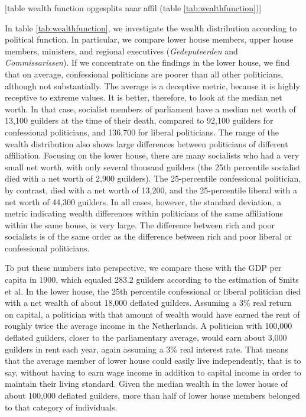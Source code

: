 \begin{center}
    
    [table wealth function opgesplits naar affil (table \ref{tab:wealthfunction})]
\end{center}

    In table \ref{tab:wealthfunction}, we investigate the wealth distribution according to political function. In particular, we compare lower house members, upper house members, ministers, and regional executives (\textit{Gedeputeerden} and \textit{Commissarissen}). If we concentrate on the findings in the lower house, we find that on average, confessional politicians are poorer than all other politicians, although not substantially. The average is a deceptive metric, because it is highly receptive to extreme values. It is better, therefore, to look at the median net worth. In that case, socialist members of parliament have a median net worth of 13,100 guilders at the time of their death, compared to 92,100 guilders for confessional politicians, and 136,700 for liberal politicians. The range of the wealth distribution also shows large differences between politicians of different affiliation. Focusing on the lower house, there are many socialists who had a very small net worth, with only several thousand guilders (the 25th percentile socialist died with a net worth of 2,900 guilders). The 25-percentile confessional politician, by contrast, died with a net worth of 13,200, and the  25-percentile liberal with a net worth of 44,300 guilders.  In all cases, however, the standard deviation, a metric indicating wealth differences within politicians of the same affiliations within the same house, is very large. The difference between rich and poor socialists is of the same order as the difference between rich and poor liberal or confessional politicians. 
    
    To put these numbers into perspective, we compare these with the GDP per capita in 1900, which equaled 283.2 guilders according to the estimation of Smits et al.\autocite{smits2000dutch} In the lower house, the 25th percentile confessional or liberal politician died with a net wealth of about 18,000 deflated guilders. Assuming a 3\% real return on capital, a politician with that amount of wealth would have earned the rent of roughly twice the average income in the Netherlands. A politician with 100,000 deflated guilders, closer to the parliamentary average, would earn about 3,000 guilders in rent each year, again assuming a 3\% real interest rate. That means that the average member of lower house could easily live independently, that is to say, without having to earn wage income in addition to capital income in order to maintain their living standard. Given the median wealth in the lower house of about 100,000 deflated guilders, more than half of lower house members belonged to that category of individuals. 
    
